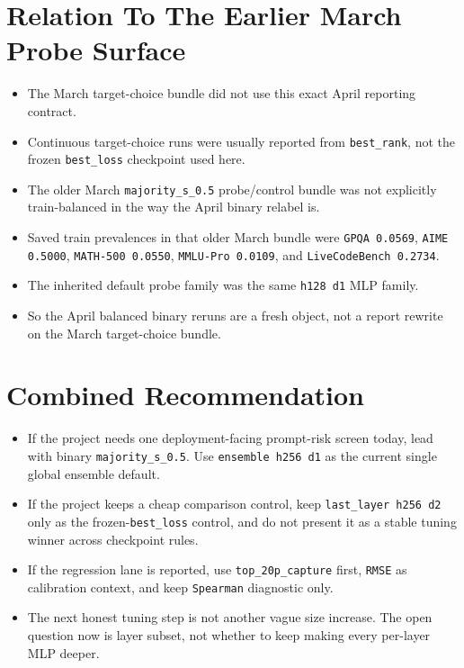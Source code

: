 \documentclass[11pt]{article}
\begin{document}
\section*{Relation To The Earlier March Probe Surface}
\begin{itemize}[leftmargin=1.5em]
\item The March target-choice bundle did not use this exact April reporting contract.
\item Continuous target-choice runs were usually reported from \texttt{best\_rank}, not the frozen \texttt{best\_loss} checkpoint used here.
\item The older March \texttt{majority\_s\_0.5} probe/control bundle was not explicitly train-balanced in the way the April binary relabel is.
\item Saved train prevalences in that older March bundle were \texttt{GPQA 0.0569}, \texttt{AIME 0.5000}, \texttt{MATH-500 0.0550}, \texttt{MMLU-Pro 0.0109}, and \texttt{LiveCodeBench 0.2734}.
\item The inherited default probe family was the same \texttt{h128 d1} MLP family.
\item So the April balanced binary reruns are a fresh object, not a report rewrite on the March target-choice bundle.
\end{itemize}

\section*{Combined Recommendation}
\begin{itemize}[leftmargin=1.5em]
\item If the project needs one deployment-facing prompt-risk screen today, lead with binary \texttt{majority\_s\_0.5}. Use \texttt{ensemble h256 d1} as the current single global ensemble default.
\item If the project keeps a cheap comparison control, keep \texttt{last\_layer h256 d2} only as the frozen-\texttt{best\_loss} control, and do not present it as a stable tuning winner across checkpoint rules.
\item If the regression lane is reported, use \texttt{top\_20p\_capture} first, \texttt{RMSE} as calibration context, and keep \texttt{Spearman} diagnostic only.
\item The next honest tuning step is not another vague size increase. The open question now is layer subset, not whether to keep making every per-layer MLP deeper.
\end{itemize}
\end{document}
